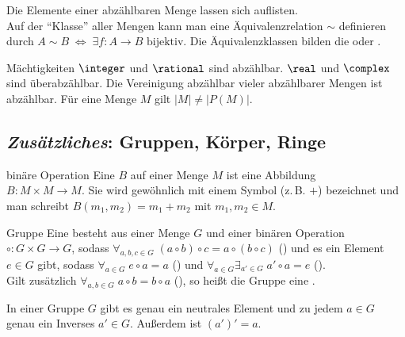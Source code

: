 \begin{Bem}
    Die Elemente einer abzählbaren Menge lassen sich auflisten. \\
    Auf der "`Klasse"' aller Mengen kann man eine Äquivalenzrelation $\sim$
    definieren durch $A \sim B \;\Leftrightarrow\;
    \exists f: A \rightarrow B \text{ bijektiv}$.
    Die Äquivalenzklassen bilden die  oder
    .
\end{Bem}

\begin{Satz}{Mächtigkeiten}
    $\integer$ und $\rational$ sind abzählbar.
    $\real$ und $\complex$ sind überabzählbar.
    Die Vereinigung abzählbar vieler abzählbarer Mengen ist abzählbar.
    Für eine Menge $M$ gilt $|M| \not= |P(M)|$.
\end{Satz}

\subsection{%
    \emph{Zusätzliches}: Gruppen, Körper, Ringe%
}

\begin{Def}{binäre Operation}
    Eine  $B$ auf einer Menge $M$ ist eine
    Abbildung  \\
    $B: M \times M \rightarrow M$.
    Sie wird gewöhnlich mit einem Symbol (z.\,B. $+$) bezeichnet
    und man schreibt $B(m_1, m_2) = m_1 + m_2$ mit $m_1, m_2 \in M$.
\end{Def}

\begin{Def}{Gruppe}
    Eine  besteht aus einer Menge $G$ und einer binären
    Operation $\circ: G \times G \rightarrow G$, sodass
    $\forall_{a, b, c \in G}\; (a \circ b) \circ c = a \circ (b \circ c)$
    () und es ein Element $e \in G$ gibt, sodass
    $\forall_{a \in G}\; e \circ a = a$ () und
    $\forall_{a \in G} \exists_{a' \in G}\; a' \circ a = e$
    (). \\
    Gilt zusätzlich $\forall_{a, b \in G}\; a \circ b = b \circ a$
    (), so heißt die Gruppe eine
    .
\end{Def}

\begin{Bem}
    In einer Gruppe $G$ gibt es genau ein neutrales Element und zu jedem
    $a \in G$ genau ein Inverses $a' \in G$.
    Außerdem ist $(a')' = a$.
\end{Bem}


